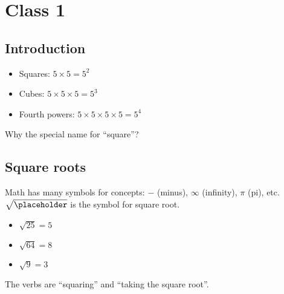 \documentclass{hw}
\begin{document}
\section*{Class 1}
\subsection*{\normalsize Introduction}
\begin{itemize}
    \item Squares: $5 \times 5 = 5^2$
    \item Cubes: $5 \times 5 \times 5 = 5^3$
    \item Fourth powers: $5 \times 5 \times 5 \times 5 = 5^4$
\end{itemize}
Why the special name for ``square''?

\subsection*{\normalsize Square roots}
Math has many symbols for concepts: $-$ (minus), $\infty$ (infinity), $\pi$ (pi), etc.
\\ \bigskip
$\mathbf{\sqrt{\placeholder}}$ is the symbol for square root.
\begin{itemize}
    \item $\sqrt{25} = 5$
    \item $\sqrt{64} = 8$
    \item $\sqrt{9} = 3$
\end{itemize}
The verbs are ``squaring'' and ``taking the square root''.
\end{document}
